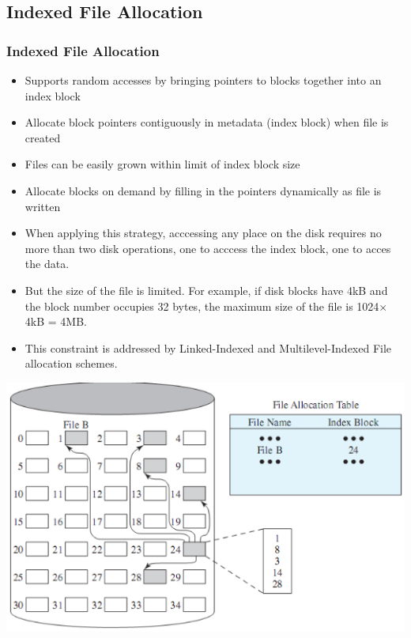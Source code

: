 \documentclass{beamer}
\begin{document}
\subsection{Indexed File Allocation}
\begin{frame}[allowframebreaks]
\frametitle{Indexed File Allocation}
\begin{itemize}
\item Supports random accesses by bringing pointers to blocks together into an index block
\item Allocate block pointers contiguously in metadata (index block) when file is created
\item Files can be easily grown within limit of index block size
\item Allocate blocks on demand by filling in the pointers dynamically as file is written
\item When applying this strategy, acccessing any place on the disk requires no more than two disk operations, one to acccess the index block, one to acces the data.
\item But the size of the file is limited. For example, if disk blocks have 4kB and the block number occupies 32 bytes, the maximum size of the file is 1024$\times$4kB = 4MB.
\item This constraint is addressed by Linked-Indexed and Multilevel-Indexed File allocation schemes.
\end{itemize}
\includegraphics[scale=0.5]{index.png}
\end{frame}
\end{document}
